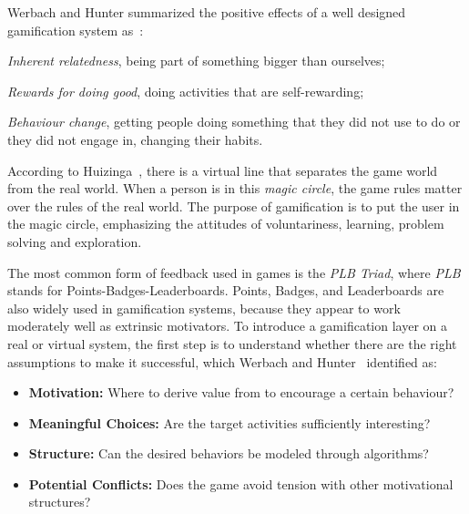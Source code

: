 Werbach and Hunter summarized the positive effects of a well designed gamification system as~\cite{Werb2012a}:
\begin{inparaenum}[i)]
  \item \emph{Inherent relatedness}, \ie being part of something bigger than ourselves;
  \item \emph{Rewards for doing good}, \ie doing activities that are self-rewarding;
  \item \emph{Behaviour change}, \ie getting people doing something that they did not use to do or they did not engage in, changing their habits.
\end{inparaenum}

According to Huizinga~\cite{Huizinga2006}, there is a virtual line that separates the game world from the real world.
When a person is in this \emph{magic circle}, the game rules matter over the rules of the real world.
The purpose of gamification is to put the user in the magic circle, emphasizing the attitudes of voluntariness, learning, problem solving and exploration.

The most common form of feedback used in games is the \emph{PLB Triad}, where \emph{PLB} stands for Points-Badges-Leaderboards.
Points, Badges, and Leaderboards are also widely used in gamification systems, because they appear to work moderately well as extrinsic motivators.
To introduce a gamification layer on a real or virtual system, the first step is to understand whether there are the right assumptions to make it successful, which Werbach and Hunter~\cite{Werb2012a} identified as:

\begin{itemize}
  \item \textbf{Motivation:} Where to derive value from to encourage a certain behaviour?
  \item \textbf{Meaningful Choices:} Are the target activities sufficiently interesting?
  \item \textbf{Structure:} Can the desired behaviors be modeled through algorithms?
  \item \textbf{Potential Conflicts:} Does the game avoid tension with other motivational structures?
\end{itemize}

